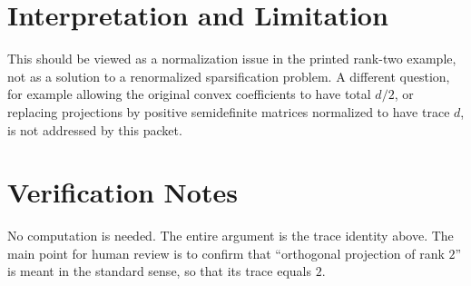 \documentclass[11pt]{article}
\begin{document}
\section*{Interpretation and Limitation}

This should be viewed as a normalization issue in the printed rank-two example,
not as a solution to a renormalized sparsification problem. A different
question, for example allowing the original convex coefficients to have total
\(d/2\), or replacing projections by positive semidefinite matrices normalized
to have trace \(d\), is not addressed by this packet.

\section*{Verification Notes}

No computation is needed. The entire argument is the trace identity above.
The main point for human review is to confirm that ``orthogonal projection of
rank \(2\)'' is meant in the standard sense, so that its trace equals \(2\).
\end{document}
